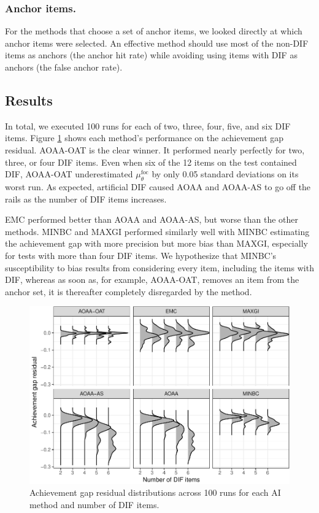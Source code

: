\documentclass[
  11pt,
]{article}
\begin{document}
\hypertarget{anchor-items.}{%
\subsubsection{Anchor items.}\label{anchor-items.}}

For the methods that choose a set of anchor items, we looked directly at which anchor items were selected. An effective method should use most of the non-DIF items as anchors (the anchor hit rate) while avoiding using items with DIF as anchors (the false anchor rate).

\hypertarget{results}{%
\subsection{Results}\label{results}}

In total, we executed 100 runs for each of two, three, four, five, and six DIF items. Figure \ref{fig:achievegap} shows each method's performance on the achievement gap residual. AOAA-OAT is the clear winner. It performed nearly perfectly for two, three, or four DIF items. Even when six of the 12 items on the test contained DIF, AOAA-OAT underestimated \(\mu_\theta^\text{foc}\) by only 0.05 standard deviations on its worst run. As expected, artificial DIF caused AOAA and AOAA-AS to go off the rails as the number of DIF items increases.

EMC performed better than AOAA and AOAA-AS, but worse than the other methods. MINBC and MAXGI performed similarly well with MINBC estimating the achievement gap with more precision but more bias than MAXGI, especially for tests with more than four DIF items. We hypothesize that MINBC's susceptibility to bias results from considering every item, including the items with DIF, whereas as soon as, for example, AOAA-OAT, removes an item from the anchor set, it is thereafter completely disregarded by the method.

\begin{figure}[H]

{\centering \includegraphics[width=0.7\linewidth]{paper_files/figure-latex/achievegap-1} 

}

\caption{Achievement gap residual distributions across 100 runs for each AI method and number of DIF items.}\label{fig:achievegap}
\end{figure}
\end{document}
